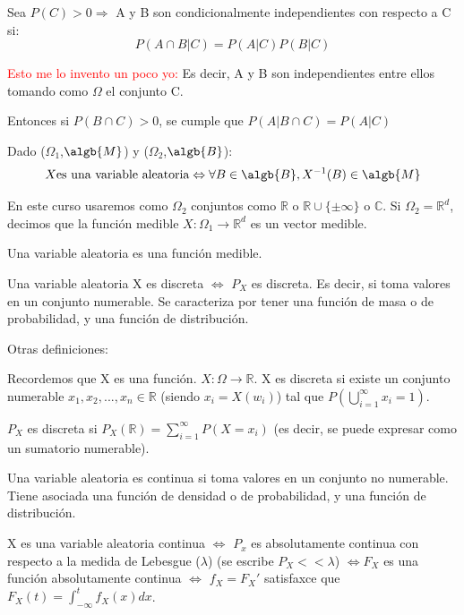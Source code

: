 \documentclass{apuntes}
\begin{document}
\begin{defn} Sea $P(C)>0 \Rightarrow$ A y B son condicionalmente independientes con respecto a C si: 
\[
P(A\cap B|C)=P(A|C)P(B|C)
\]

\textcolor{red}{Esto me lo invento un poco yo:} Es decir, A y B son independientes entre ellos tomando como $\Omega$ el conjunto C.

Entonces si $P(B\cap C)>0$, se cumple que $P(A|B\cap C)=P(A|C)$
\end{defn}

\begin{defn} 
Dado ($\Omega_1$,$\algb{M}$) y ($\Omega_2$,$\algb{B}$):
\[
X \text{es una variable aleatoria} \Leftrightarrow \forall B \in \algb{B}, X^{-1}(B) \in \algb{M}
\]

En este curso usaremos como $\Omega_2$ conjuntos como $\mathbb{R}$ o $\mathbb{R} \cup \{\pm \infty\}$ o $\mathbb{C}$. Si $\Omega_2 = \mathbb{R}^d$, decimos que la función medible $X: \Omega_1 \rightarrow \mathbb{R}^d$ es un vector medible.
\end{defn}
\obs Una variable aleatoria es una función medible.

\begin{defn}
Una variable aleatoria X es discreta $\Leftrightarrow$ $P_X$ es discreta. Es decir, si toma valores en un conjunto numerable. Se caracteriza por tener una función de masa o de probabilidad, y una función de distribución.

Otras definiciones:

Recordemos que X es una función. $X: \Omega \rightarrow \mathbb{R}$. X es discreta si existe un conjunto numerable $x_1, x_2,...,x_n \in \mathbb{R}$ (siendo $x_i=X(w_i)$) tal que $P(\bigcup_{i=1}^{\infty}x_i=1)$.

$P_X$ es discreta si $P_X(\mathbb{R})=\sum_{i=1}^{\infty}P(X=x_i)$ (es decir, se puede expresar como un sumatorio numerable).
\end{defn}

\begin{defn}
Una variable aleatoria es continua si toma valores en un conjunto no numerable. Tiene asociada una función de densidad o de probabilidad, y una función de distribución.

X es una variable aleatoria continua $\Leftrightarrow$ $P_x$ es absolutamente continua con respecto a la medida de Lebesgue ($\lambda$) (se escribe $P_X << \lambda$) $\Leftrightarrow F_X$ es una función absolutamente continua $\Leftrightarrow$ $f_X=F_X'$ satisfaxce que $F_X(t)=\int_{-\infty}^{t}f_X(x)dx$.
\end{defn}
\end{document}
